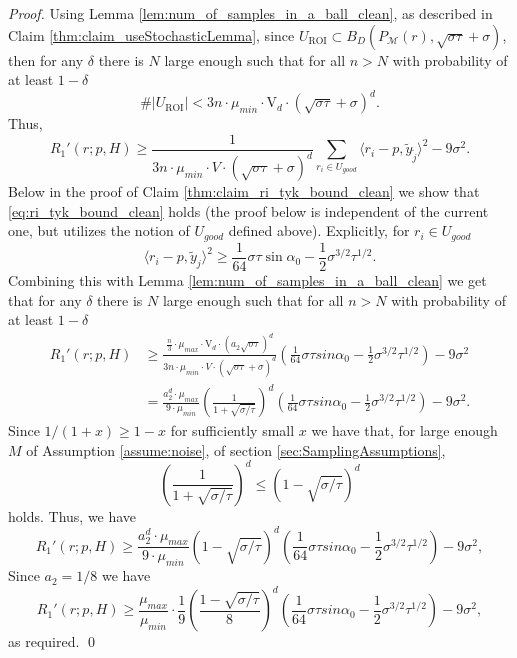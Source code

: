\documentclass[12pt]{article}
\theoremstyle{remark}
\newcommand{\MM}{\mathcal{M}}
\newcommand{\lrangle}[1]{\langle #1 \rangle}
\begin{document}
\begin{proof}
Using Lemma \ref{lem:num_of_samples_in_a_ball_clean}, as described in Claim \ref{thm:claim_useStochasticLemma}, since $U_\textrm{ROI}\subset B_D(P_{\MM}(r), \sqrt{\sigma \tau}+\sigma)$, then for any $\delta$ there is $N$ large enough such that for all $n>N$  with probability of at least $1 - \delta$ 
\[
\#|U_\textrm{ROI}| < 3n\cdot\mu_{min}\cdot \mathrm{V}_{d}\cdot (\sqrt{\sigma\tau}+\sigma)^d 
.\]
Thus,
\[
R_1'(r; p, H) \geq \frac{1}{3n\cdot\mu_{min}\cdot V\cdot ( \sqrt{\sigma\tau} +\sigma)^d }\sum\limits_{r_i\in U_{good}}  \langle r_i - p, \tilde{y}_{\tilde j} \rangle^2
-9\sigma^2
.\]
Below in the proof of Claim \ref{thm:claim_ri_tyk_bound_clean} we show that \eqref{eq:ri_tyk_bound_clean} holds (the proof below is independent of the current one, but utilizes the notion of $U_{good}$ defined above).
Explicitly, for $ r_i \in U_{good} $
\begin{equation*}
\lrangle{r_i - p, \tilde y_j}^2 \geq \frac{1}{64}\sigma \tau \sin\alpha_0 - \frac{1}{2}\sigma^{3/2}\tau^{1/2}
.\end{equation*}
Combining this with Lemma \ref{lem:num_of_samples_in_a_ball_clean} we get that for any $\delta$ there is $N$ large enough such that for all $n>N$  with probability of at least $1-\delta$
\begin{align*}
R_1'(r; p, H) 
&\geq 
\frac{\frac{n}{3}\cdot \mu_{max}\cdot \mathrm{V}_d \cdot(a_2\sqrt{\sigma\tau})^d}{3n\cdot\mu_{min}\cdot V\cdot ( \sqrt{\sigma\tau}+\sigma)^d}\left(\frac{1}{64}\sigma\tau sin\alpha_0 -  \frac{1}{2}\sigma^{3/2}\tau^{1/2} \right)
-9\sigma^2 \\
&=
\frac{ a_2^d\cdot\mu_{max}}{9\cdot\mu_{min}}\left(\frac{ 1}{1+\sqrt{\sigma/\tau}}\right)^d\left(\frac{1}{64}\sigma\tau sin\alpha_0 - \frac{1}{2}\sigma^{3/2}\tau^{1/2} \right)
-9 \sigma^2
.\end{align*}
Since $1/(1+x) \geq 1-x$ for sufficiently small $x$ we have that, for large enough $M$ of Assumption \ref{assume:noise}, of section \ref{sec:SamplingAssumptions},
\[
\left(\frac{ 1}{1+\sqrt{\sigma/\tau}}\right)^d \leq (1-\sqrt{\sigma/\tau})^d
\]
holds.
Thus, we have 
\[
R_1'(r; p, H) \geq \frac{ a_2^d\cdot\mu_{max}}{9\cdot\mu_{min}}(1-\sqrt{\sigma/\tau})^d\left(\frac{1}{64}\sigma\tau sin\alpha_0 - \frac{1}{2}\sigma^{3/2}\tau^{1/2} \right)
-9 \sigma^2,
\]
Since $a_2 = 1/8$ we have 
\[
R_1'(r; p, H) \geq \frac{ \mu_{max}}{\mu_{min}}\cdot\frac{1}{9}\left(\frac{1-\sqrt{\sigma/\tau}}{ 8}\right)^d \left(\frac{1}{64}\sigma\tau sin\alpha_0 - \frac{1}{2}\sigma^{3/2}\tau^{1/2} \right)
-9 \sigma^2,
\]
as required.
\qed


\end{proof}
\end{document}
